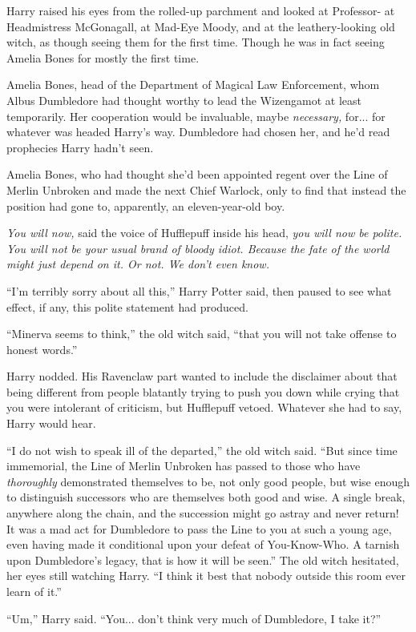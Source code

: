 Harry raised his eyes from the rolled-up parchment and looked at Professor- at Headmistress McGonagall, at Mad-Eye Moody, and at the leathery-looking old witch, as though seeing them for the first time. Though he was in fact seeing Amelia Bones for mostly the first time.

Amelia Bones, head of the Department of Magical Law Enforcement, whom Albus Dumbledore had thought worthy to lead the Wizengamot at least temporarily. Her cooperation would be invaluable, maybe \emph{necessary,} for... for whatever was headed Harry's way. Dumbledore had chosen her, and he'd read prophecies Harry hadn't seen.

Amelia Bones, who had thought she'd been appointed regent over the Line of Merlin Unbroken and made the next Chief Warlock, only to find that instead the position had gone to, apparently, an eleven-year-old boy.

\emph{You will now,} said the voice of Hufflepuff inside his head, \emph{you will now be polite. You will not be your usual brand of bloody idiot. Because the fate of the world might just depend on it. Or not. We don't even know.}

``I'm terribly sorry about all this,'' Harry Potter said, then paused to see what effect, if any, this polite statement had produced.

``Minerva seems to think,'' the old witch said, ``that you will not take offense to honest words.''

Harry nodded. His Ravenclaw part wanted to include the disclaimer about that being different from people blatantly trying to push you down while crying that you were intolerant of criticism, but Hufflepuff vetoed. Whatever she had to say, Harry would hear.

``I do not wish to speak ill of the departed,'' the old witch said. ``But since time immemorial, the Line of Merlin Unbroken has passed to those who have \emph{thoroughly} demonstrated themselves to be, not only good people, but wise enough to distinguish successors who are themselves both good and wise. A single break, anywhere along the chain, and the succession might go astray and never return! It was a mad act for Dumbledore to pass the Line to you at such a young age, even having made it conditional upon your defeat of You-Know-Who. A tarnish upon Dumbledore's legacy, that is how it will be seen.'' The old witch hesitated, her eyes still watching Harry. ``I think it best that nobody outside this room ever learn of it.''

``Um,'' Harry said. ``You... don't think very much of Dumbledore, I take it?''

